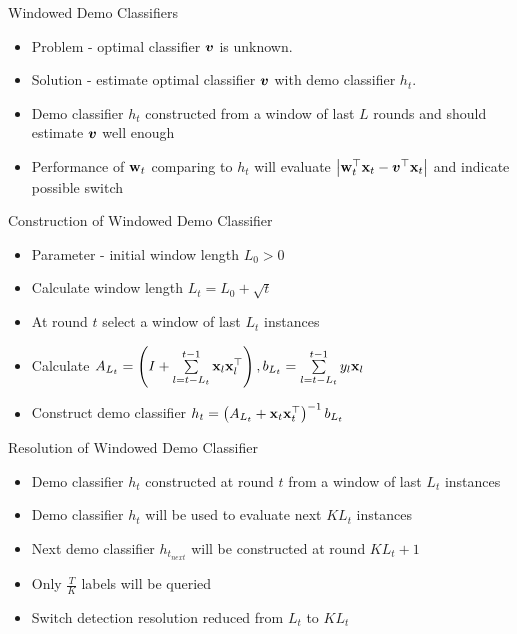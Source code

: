 \documentclass{beamer}
\begin{document}
\begin{frame}{Windowed Demo Classifiers}
\begin{itemize}
\item Problem - optimal classifier ${\boldsymbol{v}}$ is unknown.\newline
\item Solution - estimate optimal classifier ${\boldsymbol{v}}$ with demo classifier $h_t$. \newline
\item Demo classifier $h_t$  constructed from a window of last $L$ rounds and should estimate ${\boldsymbol{v}}$ well enough \newline
\item Performance of $\mathbf{w}_{t}$ comparing to $h_t$ will evaluate $\left\vert{\mathbf{w}}^{\top}_{t}\mathbf{x}_{t}-{{\boldsymbol{v}}}^{\top}\mathbf{x}_{t}\right\vert$ and indicate possible switch
\end{itemize}
\end{frame}


\begin{frame}{Construction of Windowed Demo Classifier}
\begin{itemize}
\item Parameter - initial window length $L_0>0$ \newline
\item Calculate window length $L_t=L_0+\sqrt{t}$\newline
\item At round $t$  select a window of last $L_t$ instances  \newline
\item Calculate $A_{L_t}=\left(I+\sum\limits_{l=t-L_t}^{t-1}{\mathbf{x}_{l}{\mathbf{x}}^{\top}_{l}}\right), b_{L_t}=\sum\limits_{l=t-L_t}^{t-1}y_l\mathbf{x}_{l}$ \newline
\item Construct demo classifier $h_t=\left(A_{L_t}+\mathbf{x}_{t}{\mathbf{x}}^{\top}_{t}\right)^{-1}b_{L_t}$
\end{itemize}
\end{frame}

\begin{frame}{Resolution of Windowed Demo Classifier}

\begin{itemize}
\item Demo classifier $h_t$ constructed at round $t$ from a window of last $L_t$ instances\newline
\item Demo classifier $h_t$ will be used to evaluate next  $KL_t$ instances\newline
\item Next demo classifier $h_{t_{next}}$ will be constructed at round $KL_t+1$\newline
\item Only $\frac{T}{K}$ labels will be queried\newline
\item Switch detection resolution reduced from $L_t$ to $KL_t$
\end{itemize}

\end{frame}
\end{document}
